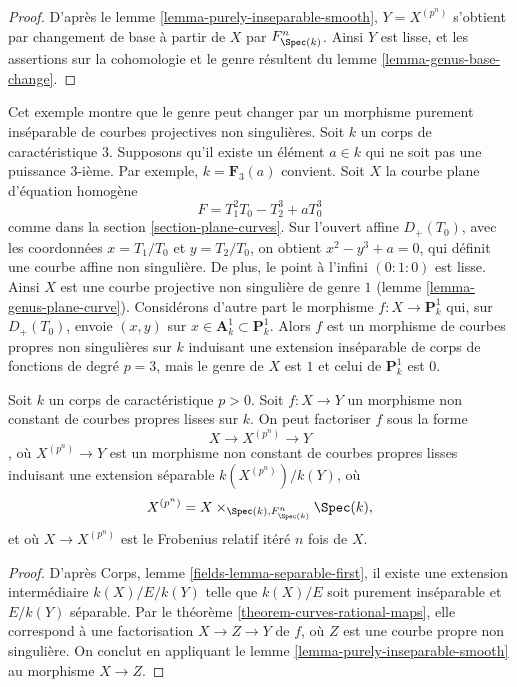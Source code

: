 \begin{proof}
D'après le lemme \ref{lemma-purely-inseparable-smooth}, $Y = X^{(p^n)}$ s'obtient par changement de base à partir de $X$ par $F_{\Spec(k)}^n$. Ainsi $Y$ est lisse, et les assertions sur la cohomologie et le genre résultent du lemme \ref{lemma-genus-base-change}.
\end{proof}

\begin{example}
\label{example-inseparable}
Cet exemple montre que le genre peut changer par un morphisme purement inséparable de courbes projectives non singulières. Soit $k$ un corps de caractéristique $3$. Supposons qu'il existe un élément $a \in k$ qui ne soit pas une puissance $3$-ième. Par exemple, $k = \mathbf{F}_3(a)$ convient. Soit $X$ la courbe plane d'équation homogène $$
F = T_1^2T_0 - T_2^3 + aT_0^3
$$ comme dans la section \ref{section-plane-curves}. Sur l'ouvert affine $D_+(T_0)$, avec les coordonnées $x = T_1/T_0$ et $y = T_2/T_0$, on obtient $x^2 - y^3 + a = 0$, qui définit une courbe affine non singulière. De plus, le point à l'infini $(0 : 1: 0)$ est lisse. Ainsi $X$ est une courbe projective non singulière de genre $1$ (lemme \ref{lemma-genus-plane-curve}). Considérons d'autre part le morphisme $f : X \to \mathbf{P}^1_k$ qui, sur $D_+(T_0)$, envoie $(x, y)$ sur $x \in \mathbf{A}^1_k \subset \mathbf{P}^1_k$. Alors $f$ est un morphisme de courbes propres non singulières sur $k$ induisant une extension inséparable de corps de fonctions de degré $p = 3$, mais le genre de $X$ est $1$ et celui de $\mathbf{P}^1_k$ est $0$.
\end{example}

\begin{proposition}
\label{proposition-unwind-morphism-smooth}
Soit $k$ un corps de caractéristique $p > 0$. Soit $f : X \to Y$ un morphisme non constant de courbes propres lisses sur $k$. On peut factoriser $f$ sous la forme $$
X \longrightarrow X^{(p^n)} \longrightarrow Y
$$, où $X^{(p^n)} \to Y$ est un morphisme non constant de courbes propres lisses induisant une extension séparable $k(X^{(p^n)})/k(Y)$, où $$
X^{(p^n)} = X \times_{\Spec(k), F_{\Spec(k)}^n} \Spec(k),
$$ et où $X \to X^{(p^n)}$ est le Frobenius relatif itéré $n$ fois de $X$.
\end{proposition}

\begin{proof}
D'après Corps, lemme \ref{fields-lemma-separable-first}, il existe une extension intermédiaire $k(X)/E/k(Y)$ telle que $k(X)/E$ soit purement inséparable et $E/k(Y)$ séparable. Par le théorème \ref{theorem-curves-rational-maps}, elle correspond à une factorisation $X \to Z \to Y$ de $f$, où $Z$ est une courbe propre non singulière. On conclut en appliquant le lemme \ref{lemma-purely-inseparable-smooth} au morphisme $X \to Z$.
\end{proof}

